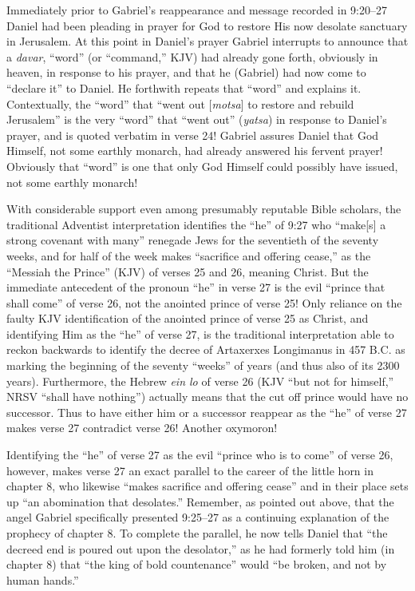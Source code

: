 \newpage
Immediately prior to Gabriel's reappearance and message recorded in 9:20--27
Daniel had been pleading in prayer for God to restore His now desolate
sanctuary in Jerusalem. At this point in 
Daniel's prayer Gabriel
interrupts to announce that a \textit{davar}, 
``word'' (or ``command,'' KJV) had
already gone forth, obviously in heaven, in response to his prayer, and that
he (Gabriel) had now come to ``declare it'' to Daniel. He forthwith repeats
that ``word'' and explains it. 
Contextually, the ``word'' that ``went out
[\textit{motsa}] to restore and rebuild Jerusalem'' is the 
very ``word'' that ``went
out'' (\textit{yatsa}) in response to Daniel's prayer, and is 
quoted verbatim in
verse 24! Gabriel assures Daniel that God Himself, not some earthly monarch,
had already answered his fervent prayer! Obviously that ``word'' 
is one
that only God Himself could possibly have issued, not some earthly monarch!

With considerable support even among presumably reputable Bible scholars,
the traditional Adventist interpretation identifies the ``he'' of 9:27 who
``make[s] a strong covenant with many'' renegade Jews for the seventieth of 
the seventy weeks, and for half of the 
week makes ``sacrifice and
offering cease,'' as the ``Messiah the Prince'' (KJV) of verses 25 and 26,
meaning Christ. But the immediate antecedent of the pronoun ``he'' in verse 27
is the evil ``prince that shall come'' of verse 26, not the anointed prince of
verse 25! Only reliance on the faulty KJV identification of the anointed
prince of verse 25 as Christ, and identifying Him as the ``he'' of verse 27,
is the traditional interpretation able to reckon backwards to identify the
decree of Artaxerxes Longimanus in 457 B.C. as marking the beginning of the
seventy ``weeks'' of years (and thus also of its 2300 years). Furthermore, the
Hebrew \textit{ein lo} of verse 26 (KJV ``but not for himself,'' NRSV ``shall have
nothing'') actually means that the cut off prince would have no successor.
Thus to have either him or a successor reappear as the ``he'' of verse 27
makes verse 27 contradict verse 26! Another oxymoron!

Identifying the ``he'' of verse 27 as the evil ``prince who is to come'' of
verse 26, however, makes verse 27 an exact parallel to the career of the
little horn in chapter 8, who likewise ``makes sacrifice and offering cease''
and in their place sets up ``an abomination that 
desolates.'' 
Remember, as
pointed out above, that the angel Gabriel specifically presented 9:25--27 as
a continuing explanation of the prophecy of chapter 8. To complete the
parallel, he now tells Daniel that ``the decreed end is poured out upon
the desolator,'' as he had formerly told him (in chapter 8) that ``the king of
bold countenance'' would ``be broken, and not by human 
hands.''

